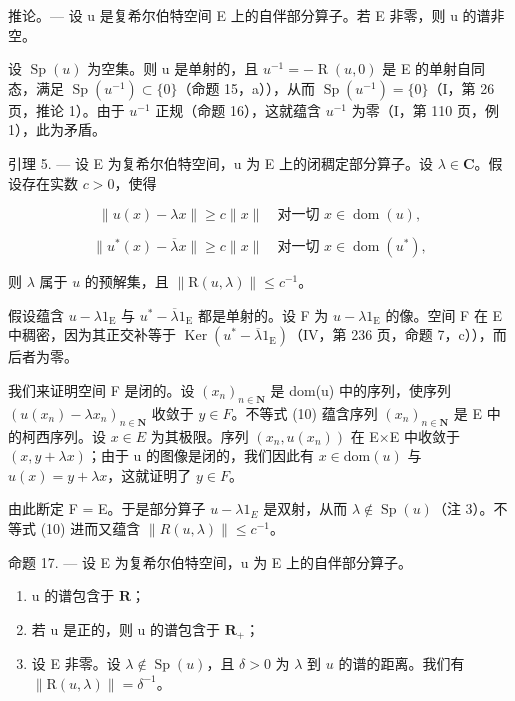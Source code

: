 推论。--- 设 u 是复希尔伯特空间 E 上的自伴部分算子。若 E 非零，则 u 的谱非空。

设 \(\operatorname{Sp}(u)\) 为空集。则 u 是单射的，且 \(u^{-1} = -\operatorname{R}(u,0)\) 是 E 的单射自同态，满足 \(\operatorname{Sp}(u^{-1}) \subset \{0\}\)（命题 15，a）），从而 \(\operatorname{Sp}(u^{-1}) = \{0\}\)（I，第 26 页，推论 1）。由于 \(u^{-1}\) 正规（命题 16），这就蕴含 \(u^{-1}\) 为零（I，第 110 页，例 1），此为矛盾。

引理 5. --- 设 E 为复希尔伯特空间，u 为 E 上的闭稠定部分算子。设 \(\lambda \in \mathbf{C}\)。假设存在实数 \(c > 0\)，使得

\[
\| u (x) - \lambda x \| \geqslant c \| x \| \quad \text{对一切 } x \in \operatorname{dom} (u),\tag{10}
\]

\[
\| u ^ {*} (x) - \overline {{\lambda}} x \| \geqslant c \| x \| \quad \text{对一切 } x \in \operatorname{dom} (u ^ {*}),\tag{11}
\]

则 \(\lambda\) 属于 \(u\) 的预解集，且 \(\| \mathrm{R}(u,\lambda)\| \leqslant c^{-1}\)。

假设蕴含 \(u - \lambda 1_{\mathrm{E}}\) 与 \(u^{*} - \overline{\lambda} 1_{\mathrm{E}}\) 都是单射的。设 F 为 \(u - \lambda 1_{\mathrm{E}}\) 的像。空间 F 在 E 中稠密，因为其正交补等于 \(\operatorname{Ker}(u^{*} - \overline{\lambda} 1_{\mathrm{E}})\)（IV，第 236 页，命题 7，c）），而后者为零。

我们来证明空间 F 是闭的。设 \((x_{n})_{n\in\mathbf{N}}\) 是 dom(u) 中的序列，使序列 \((u(x_{n})-\lambda x_{n})_{n\in\mathbf{N}}\) 收敛于 \(y\in F\)。不等式 (10) 蕴含序列 \((x_{n})_{n\in\mathbf{N}}\) 是 E 中的柯西序列。设 \(x\in E\) 为其极限。序列 \((x_{n},u(x_{n}))\) 在 E×E 中收敛于 \((x,y+\lambda x)\)；由于 u 的图像是闭的，我们因此有 \(x\in\text{dom}(u)\) 与 \(u(x)=y+\lambda x\)，这就证明了 \(y\in F\)。

由此断定 F = E。于是部分算子 \(u - \lambda1_{E}\) 是双射，从而 \(\lambda \notin \operatorname{Sp}(u)\)（注 3）。不等式 (10) 进而又蕴含 \(\|R(u, \lambda)\| \leqslant c^{-1}\)。

命题 17. — 设 E 为复希尔伯特空间，u 为 E 上的自伴部分算子。

\begin{enumerate}
\def\labelenumi{\alph{enumi})}
\item
  u 的谱包含于 \(\mathbf{R}\)；
\item
  若 u 是正的，则 u 的谱包含于 \(\mathbf{R}_{+}\)；
\item
  设 E 非零。设 \(\lambda \notin \operatorname{Sp}(u)\)，且 \(\delta > 0\) 为 \(\lambda\) 到 \(u\) 的谱的距离。我们有 \(\| \mathrm{R}(u, \lambda) \| = \delta^{-1}\)。
\end{enumerate}

